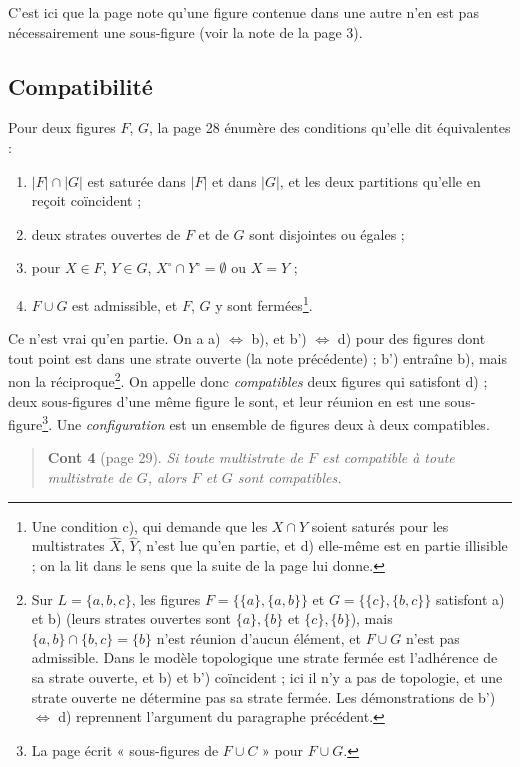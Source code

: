 \documentclass[11pt,a4paper]{article}
\begin{document}
C'est ici que la page note qu'une figure contenue dans une autre n'en est pas
nécessairement une sous-figure (voir la note de la page 3).

\subsection*{Compatibilité}

Pour deux figures $F$, $G$, la page 28 énumère des conditions qu'elle dit
équivalentes :
\begin{enumerate}
\item[a)] $|F| \cap |G|$ est saturée dans $|F|$ et dans $|G|$, et les deux
partitions qu'elle en reçoit coïncident ;
\item[b)] deux strates ouvertes de $F$ et de $G$ sont disjointes ou égales ;
\item[b')] pour $X \in F$, $Y \in G$, $X^{\circ} \cap Y^{\circ} = \emptyset$ ou
$X = Y$ ;
\item[d)] $F \cup G$ est admissible, et $F$, $G$ y sont fermées\footnote{Une
condition c), qui demande que les $X \cap Y$ soient saturés pour les
multistrates $\widehat{X}$, $\widehat{Y}$, n'est lue qu'en partie, et d)
elle-même est en partie illisible ; on la lit dans le sens que la suite de la
page lui donne.}.
\end{enumerate}
Ce n'est vrai qu'en partie. On a a) $\Leftrightarrow$ b), et b')
$\Leftrightarrow$ d) pour des figures dont tout point est dans une strate
ouverte (la note précédente) ; b') entraîne b), mais non la
réciproque\footnote{Sur $L = \{a, b, c\}$, les figures $F = \{\{a\}, \{a, b\}\}$
et $G = \{\{c\}, \{b, c\}\}$ satisfont a) et b) (leurs strates ouvertes sont
$\{a\}, \{b\}$ et $\{c\}, \{b\}$), mais $\{a,b\} \cap \{b,c\} = \{b\}$ n'est
réunion d'aucun élément, et $F \cup G$ n'est pas admissible. Dans le modèle
topologique une strate fermée est l'adhérence de sa strate ouverte, et b) et
b') coïncident ; ici il n'y a pas de topologie, et une strate ouverte ne
détermine pas sa strate fermée. Les démonstrations de b') $\Leftrightarrow$ d)
reprennent l'argument du paragraphe précédent.}. On appelle donc
\emph{compatibles} deux figures qui satisfont d) ; deux sous-figures d'une même
figure le sont, et leur réunion en est une sous-figure\footnote{La page écrit
« sous-figures de $F \cup C$ » pour $F \cup G$.}. Une \emph{configuration} est
un ensemble de figures deux à deux compatibles.

\begin{quote}
\textbf{Cont 4} (page 29). \emph{Si toute multistrate de $F$ est compatible à
toute multistrate de $G$, alors $F$ et $G$ sont compatibles.}
\end{quote}
\end{document}
